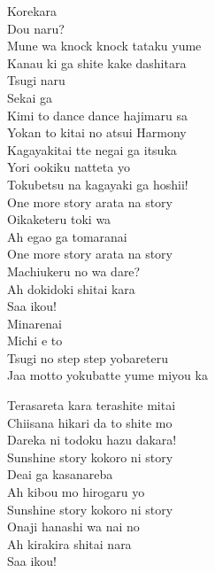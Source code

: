 \def\songtitle{One More Sunshine Story}
\def\songcomment{}
\def\songlyrics{Aki Hata}
\def\songwriter{EFFY}
\def\songarrange{EFFY}
   
\ifdefined\COMPLETE
\else
	
	
\fi
\thispagestyle{song}

\begin{multicols}{2}
Korekara \\
Dou naru? \\
Mune wa knock knock tataku yume\\
Kanau ki ga shite kake dashitara\\

Tsugi naru \\
Sekai ga \\
Kimi to dance dance hajimaru sa\\
Yokan to kitai no atsui Harmony\\

Kagayakitai tte negai ga itsuka\\
Yori ookiku natteta yo\\
Tokubetsu na kagayaki ga hoshii!\\

One more story arata na story\\
Oikaketeru toki wa\\
Ah egao ga tomaranai\\
One more story arata na story\\
Machiukeru no wa dare?\\
Ah dokidoki shitai kara\\
Saa ikou!\\

Minarenai \\
Michi e to \\
Tsugi no step step yobareteru\\
Jaa motto yokubatte yume miyou ka\columnbreak

Terasareta kara terashite mitai\\
Chiisana hikari da to shite mo\\
Dareka ni todoku hazu dakara!\\

Sunshine story kokoro ni story\\
Deai ga kasanareba\\
Ah kibou mo hirogaru yo\\
Sunshine story kokoro ni story\\
Onaji hanashi wa nai no\\
Ah kirakira shitai nara\\
Saa ikou!\\


\end{multicols}
